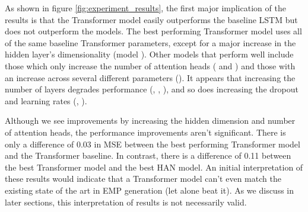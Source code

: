 As shown in figure \ref{fig:experiment_results}, the first major implication of the results is that the Transformer model easily outperforms the baseline LSTM but does not outperform the \vnet{} models. The best performing Transformer model uses all of the same baseline Transformer parameters, except for a major increase in the hidden layer's dimensionality (model ). Other models that perform well include those which only increase the number of attention heads ( and ) and those with an increase across several different parameters (). It appears that increasing the number of layers degrades performance (, , ), and so does increasing the dropout and learning rates (, ). 

Although we see improvements by increasing the hidden dimension and number of attention heads, the performance improvements aren't significant. There is only a difference of 0.03 in MSE between the best performing Transformer model and the Transformer baseline. In contrast, there is a difference of 0.11 between the best Transformer model and the best HAN model. An initial interpretation of these results would indicate that a Transformer model can't even match the existing state of the art in EMP generation (let alone beat it). As we discuss in later sections, this interpretation of results is not necessarily valid. 